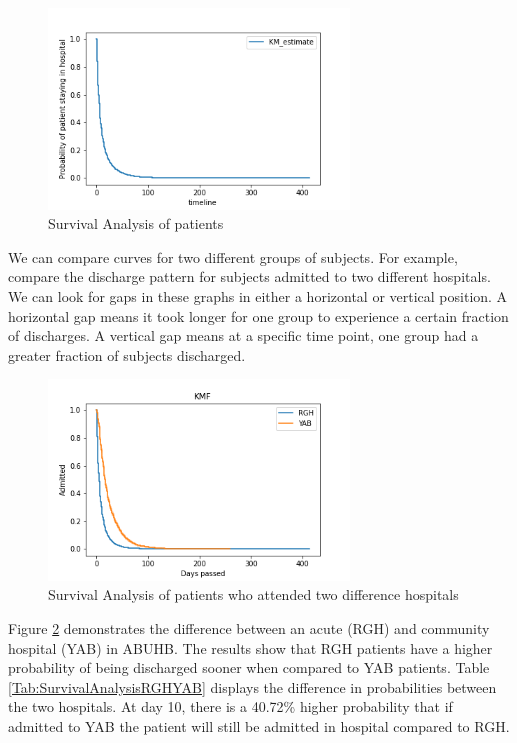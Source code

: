 \documentclass[../thesis.tex]{subfiles}
\begin{document}
\begin{figure}[H]
    \centering
    \includegraphics[width = 8cm]{Chapter3/Figures/SurvivalAnalysis.png}
    \caption{Survival Analysis of patients}
    \label{Fig:SurvivalAnalysis1}
\end{figure}

We can compare curves for two different groups of subjects. For example, compare the discharge pattern for subjects admitted to two different hospitals. We can look for gaps in these graphs in either a horizontal or vertical position. A horizontal gap means it took longer for one group to experience a certain fraction of discharges. A vertical gap means at a specific time point, one group had a greater fraction of subjects discharged.
\begin{figure}[H]
    \centering
    \includegraphics[width = 8cm]{Chapter3/Figures/RGH-YAB.png}
    \caption{Survival Analysis of patients who attended two difference hospitals}
    \label{Fig:SurvivalAnalysis2}
\end{figure}
Figure \ref{Fig:SurvivalAnalysis2} demonstrates the difference between an acute (RGH) and community hospital (YAB) in ABUHB. The results show that RGH patients have a higher probability of being discharged sooner when compared to YAB patients. Table \ref{Tab:SurvivalAnalysisRGHYAB} displays the difference in probabilities between the two hospitals. At day 10, there is a 40.72\% higher probability that if admitted to YAB the patient will still be admitted in hospital compared to RGH.
\end{document}
